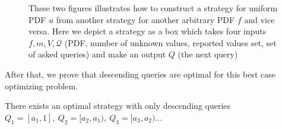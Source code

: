 \begin{figure}
\centering
  \caption{These two figures illustrates how to construct a strategy for
  uniform PDF $u$ from another strategy for another arbitrary PDF $f$ and vice
  versa. Here we depict a strategy as a box which takes four inputs $f, m, V,
  \mathcal Q$ (PDF, number of unknown values, reported values set, set of asked
  queries) and make an output $Q$ (the next query)} \label{fig:uniform}
\end{figure}

After that, we prove that descending queries are optimal for this best
case optimizing problem.

\begin{lemma}\label{lemma:descending}

There exists an optimal strategy with only descending queries
$Q_1 = [a_1, 1], ~Q_2 = [a_2, a_1), ~Q_3 = [a_3, a_2)\ldots$

\end{lemma}

